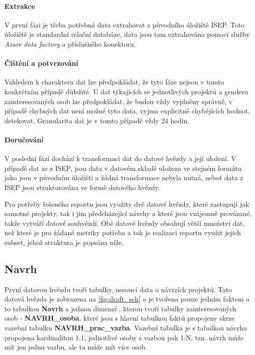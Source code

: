\documentclass[
  digital,     %
  twoside,     %
  lof,         %
  lot,         %
]{fithesis4}
\begin{document}
\paragraph{Extrakce} V první fázi je třeba potřebná data extrahovat z původního úložiště ISEP. Toto úložiště je standardní relační databáze, data jsou tam extrahována pomocí služby \emph{Azure data factory} a příslušného konektoru. 
\paragraph{Čištění a potvrzování} Vzhledem k charakteru dat lze předpokládat, že tyto fáze nejsou v tomto konkrétním případě důležité. U dat týkajících se jednotlivých projektů a genderu zainteresovaných osob lze předpokládat, že budou vždy vyplněny správně, v případě chybných dat není možné tyto data, vyjma explicitně chybějících hodnot, detekovat. Granularita dat je v tomto případě vždy 24 hodin.
\paragraph{Doručování} V poslední fází dochází k transformaci dat do datové hvězdy a její uložení. V případě dat ze z ISEP, jsou data v datovém skladě uložena ve stejném formátu jako jsou v původním úložišti a žádná transformace nebyla nutná, neboť data z ISEP jsou strukturována ve formě datového hvězdy. 

Pro potřeby řešeného reportu jsou využity dvě datové hvězdy, které zastupují jak samotné projekty, tak i jim předcházející návrhy a které jsou vzájemně provázané, takže vytváří datové souhvězdí. Obě datové hvězdy obsahují větší množství dat, než které je pro žádané metriky potřeba a tak je realizaci reportu využit jejich subset, jehož struktura je popsána níže. 

\subsection{Navrh}
První datovou hvězdu tvoří tabulky, nesoucí data o návrzích projektů. Tato datová hvězda je zobrazena na \ref{fig:draft_sch} a je tvořena pouze jedním faktem a to tabulkou \textbf{Navrh} a jednou dimenzí , kterou tvoří tabulky zainteresovaných osob - \textbf{NAVRH\_osoba}, které jsou s hlavní tabulkou faktů propojeny skrze vazební tabulku \textbf{NAVRH\_prac\_vazba}. Vazební tabulka je s tabulkou návrhu propojena kardinalitou 1:1, jednotlivé osoby s vazbou pak 1:N, tzn. návrh může mít jen jednu vazbu, ale ta může mít více osob.
\end{document}
